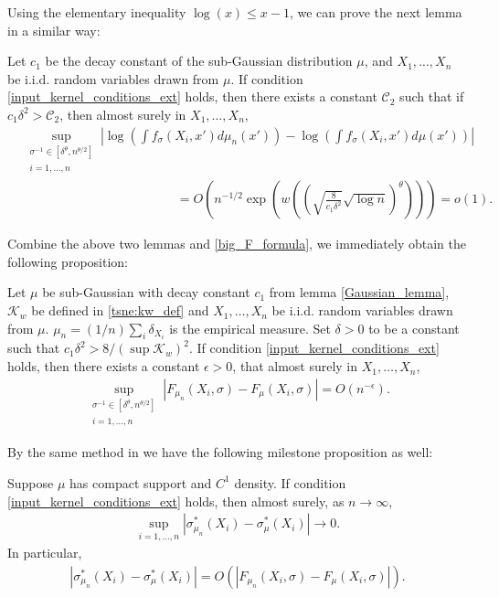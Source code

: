 Using the elementary inequality $\log(x) \leq x-1$, we can prove the next lemma in a similar way:
\begin{lemma}
    Let $c_1$ be the decay constant of the sub-Gaussian distribution $\mu$, and $X_1,\dots,X_n$ be i.i.d. random variables drawn from $\mu$. If condition \ref{input_kernel_conditions_ext} holds, then there exists a constant $\mathcal{C}_2$ such that if $c_1 \delta^2 > \mathcal{C}_2$, then almost surely in $X_1,\dots,X_n$,
    \begin{align}
         & \sup_{\substack{\sigma^{-1} \in [\delta^{\theta},n^{\theta/2}]                                                                                                               \\ i = 1,\dots, n}} \left| \log\left(\int f_{\sigma}(X_i,x') d\mu_n(x')\right)- \log\left(\int f_{\sigma}(X_i,x') d\mu(x')\right) \right| \nonumber \\
         & \qquad \qquad \qquad \qquad \qquad \qquad= O\left(n^{-1/2} \exp \left(w\left(\left(\sqrt{\frac{8}{c_1\delta^2}}\sqrt{\log n} \right)^{\theta} \right) \right)\right) = o(1).
    \end{align}
\end{lemma}
Combine the above two lemmas and \eqref{big_F_formula}, we immediately obtain the following proposition:
\begin{proposition} \label{tsne:uniform_convergence_prop}
    Let $\mu$ be sub-Gaussian with decay constant $c_1$ from lemma \ref{Gaussian_lemma}, $\mathcal{K}_w$ be defined in \eqref{tsne:kw_def} and $X_1,\dots,X_n$ be i.i.d. random variables drawn from $\mu$. $\mu_n = (1/n)\sum_i \delta_{X_i}$ is the empirical measure. Set $\delta>0$ to be a constant such that $c_1\delta^2 > 8/(\sup \mathcal{K}_w)^2$. If condition \ref{input_kernel_conditions_ext} holds, then there exists a constant $\epsilon>0$, that almost surely in $X_1,\dots,X_n$,
    \begin{align}
        \sup_{\substack{\sigma^{-1} \in [\delta^{\theta},n^{\theta/2}] \\ i = 1,\dots, n}} \left|F_{\mu_n}(X_i,\sigma)-F_{\mu}(X_i,\sigma)\right| = O(n^{-\epsilon}).
    \end{align}
\end{proposition}
By the same method in \cite{auffinger-tsne} we have the following milestone proposition as well:
\begin{proposition} \label{tsne:uniform_convergence_prop_2}
    Suppose $\mu$ has compact support and $C^1$ density. If condition \ref{input_kernel_conditions_ext} holds, then almost surely, as $n \to \infty$,
    \begin{align}
        \sup_{i=1,\dots,n} \left|\sigma_{\mu_n}^*(X_i)-\sigma_{\mu}^*(X_i)\right| \to 0.
    \end{align}
    In particular,
    \begin{align}
        \left|\sigma_{\mu_n}^*(X_i)-\sigma_{\mu}^*(X_i)\right| = O\left(\left|F_{\mu_n}(X_i,\sigma)-F_{\mu}(X_i,\sigma)\right|\right).
    \end{align}
\end{proposition}
